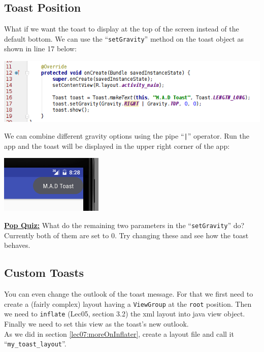 \subsection{Toast Position}
What if we want the toast to display at the top of the screen instead of the default bottom. We can use the ``\texttt{setGravity}'' method on the toast object as shown in line 17 below:

\begin{center}
	\includegraphics[scale=0.4]{chapters/ch06/images/16}
\end{center}

We can combine different gravity options using the pipe ``\texttt{|}'' operator. Run the app and the toast will be displayed in the upper right corner of the app:

\begin{center}
	\includegraphics[scale=0.4]{chapters/ch06/images/17}
\end{center}

\underline{\textbf{Pop Quiz:}} What do the remaining two parameters in the ``\texttt{setGravity}'' do? Currently both of them are set to 0. Try changing these and see how the toast behaves.

\subsection{Custom Toasts}
You can even change the outlook of the toast message. For that we first need to create a (fairly complex) layout having a \texttt{ViewGroup} at the \texttt{root} position. Then we need to \texttt{inflate} (Lec05, section 3.2) the xml layout into java view object. Finally we need to set this view as the toast's new outlook. \\

As we did in section \ref{lec07:moreOnInflater}, create a layout file and call it ``\texttt{my\_toast\_layout}''.

